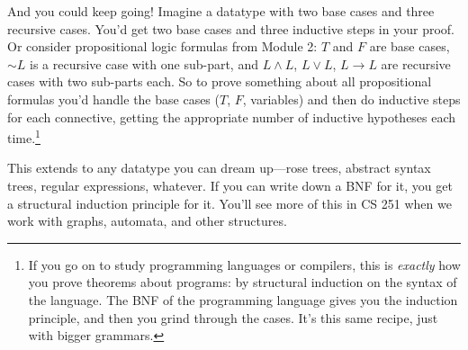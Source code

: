 \documentclass[11pt]{article}
\begin{document}
And you could keep going! Imagine a datatype with two base cases and three recursive cases. You'd get two base cases and three inductive steps in your proof. Or consider propositional logic formulas from Module 2: $T$ and $F$ are base cases, ${\sim} L$ is a recursive case with one sub-part, and $L \wedge L$, $L \vee L$, $L \to L$ are recursive cases with two sub-parts each. So to prove something about all propositional formulas you'd handle the base cases ($T$, $F$, variables) and then do inductive steps for each connective, getting the appropriate number of inductive hypotheses each time.\footnote{If you go on to study programming languages or compilers, this is \emph{exactly} how you prove theorems about programs: by structural induction on the syntax of the language. The BNF of the programming language gives you the induction principle, and then you grind through the cases. It's this same recipe, just with bigger grammars.}

This extends to any datatype you can dream up---rose trees, abstract syntax trees, regular expressions, whatever. If you can write down a BNF for it, you get a structural induction principle for it. You'll see more of this in CS 251 when we work with graphs, automata, and other structures.
\end{document}
